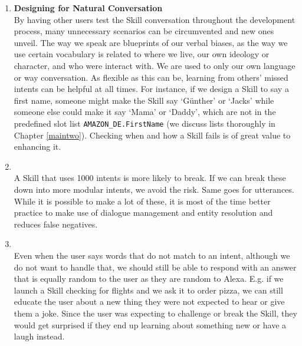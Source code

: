 \begin{enumerate}
\item \textbf{Designing for Natural Conversation}\\
By having other users test the Skill conversation throughout the development process, many unnecessary scenarios can be circumvented and new ones unveil. The way we speak are blueprints of our verbal biases, as the way we use certain vocabulary is related to where we live, our own ideology or character, and who were interact with. We are used to only our own language or way conversation. As flexible as this can be, learning from others' missed intents can be helpful at all times. For instance, if we design a Skill to say a first name, someone might make the Skill say `Günther' or `Jacks' while someone else could make it say `Mama' or `Daddy', which are not in the predefined slot list \texttt{AMAZON\_DE.FirstName} (we discuss lists thoroughly in Chapter \ref{maintwo}). Checking when and how a Skill fails is of great value to enhancing it.

\item {}\\

A Skill that uses 1000 intents is more likely to break. If we can break these down into more modular intents, we avoid the risk. Same goes for utterances. While it is possible to make a lot of these, it is most of the time better practice to make use of dialogue management and entity resolution and reduces false negatives.


\item {}\\
Even when the user says words that do not match to an intent, although we do not want to handle that, we should still be able to respond with an answer that is equally random to the user as they are random to Alexa. E.g. if we launch a Skill checking for flights and we ask it to order pizza, we can still educate the user about a new thing they were not expected to hear or give them a joke. Since the user was expecting to challenge or break the Skill, they would get surprised if they end up learning about something new or have a laugh instead.



\end{enumerate}